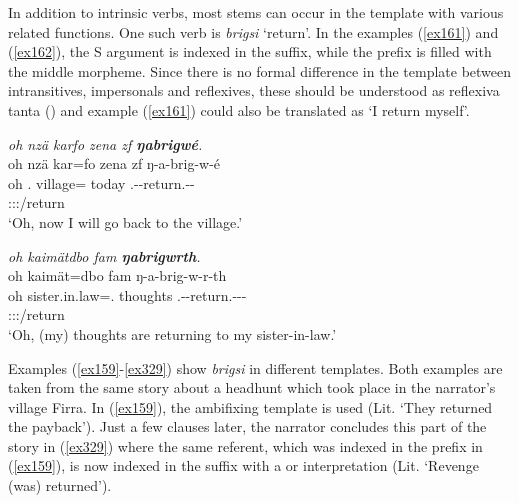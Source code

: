 In addition to intrinsic  verbs, most  stems can occur in the  template with various related functions. One such verb is \emph{brigsi} `return'. In the examples (\ref{ex161}) and (\ref{ex162}), the S argument is indexed in the suffix, while the prefix is filled with the middle morpheme. Since there is no formal difference in the  template between intransitives, impersonals and reflexives, these should be understood as reflexiva tanta (\citealt{Geniusienie:1987refl}) and example (\ref{ex161}) could also be translated as `I return myself'.

\begin{exe}
	\ex \emph{oh nzä karfo zena zf \textbf{ŋabrigwé}.}\\
	\glll oh nzä kar=fo zena zf ŋ-a-brig-w-é\\
	oh \Fsg.\Abs{} village=\All{} today \Imm{} \M.\Alph-\Vc-return.\Ext-\Ndu-\Fsg\\
	{} {} {} {} {} \footnotesize{\Fsg:\Sbj:\Nonpast:\Ipfv/return}\\
	\trans `Oh, now I will go back to the village.'
	\label{ex161}
\end{exe}
\begin{exe}
	\ex \emph{oh kaimätdbo fam \textbf{ŋabrigwrth}.}\\
	\glll oh kaimät=dbo fam ŋ-a-brig-w-r-th\\
	oh sister.in.law=\All.\Anim{} thoughts \M.\Alph-\Vc-return.\Ext-\Ndu-\Lk-\Stnsg\\
	{} {} {} \footnotesize{\Stpl:\Sbj:\Nonpast:\Ipfv/return}\\
	\trans `Oh, (my) thoughts are returning to my sister-in-law.'
	\label{ex162}
\end{exe}

Examples (\ref{ex159}-\ref{ex329}) show \emph{brigsi} in different templates. Both examples are taken from the same story about a headhunt which took place in the narrator's village Firra. In (\ref{ex159}), the ambifixing  template is used (Lit. `They returned the payback'). Just a few clauses later, the narrator concludes this part of the story in (\ref{ex329}) where the same referent, which was indexed in the prefix in (\ref{ex159}), is now indexed in the suffix with a  or  interpretation (Lit. `Revenge (was) returned').

